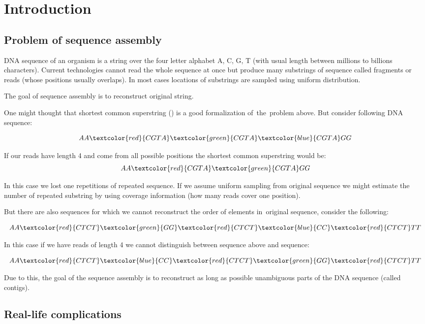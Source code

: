 \chapter{Introduction}

\section{Problem of sequence assembly}

DNA sequence of an organism is a string over the four letter alphabet A, C, G, T
(with usual length between millions to billions characters).
Current technologies cannot read the whole sequence at once but produce many
substrings of sequence called fragments or reads (whose positions usually overlaps).
In most cases locations of substrings are sampled using uniform distribution.

The goal of sequence assembly is to reconstruct original string.

One might thought that shortest common superstring (\cite{maier1977note}) 
is a good formalization of~the~problem above. But consider following DNA sequence:

$$AA\textcolor{red}{CGTA}\textcolor{green}{CGTA}\textcolor{blue}{CGTA}GG$$

If our reads have length 4 and come from all possible positions the shortest
common superstring would be:
$$AA\textcolor{red}{CGTA}\textcolor{green}{CGTA}GG$$

In this case we lost one repetitions of repeated sequence. If we assume uniform
sampling from original sequence we might estimate the number of repeated substring
by using coverage information (how many reads cover one position).

But there are also sequences for which we cannot reconstruct the order of elements
in~original sequence, consider the following:

$$AA\textcolor{red}{CTCT}\textcolor{green}{GG}\textcolor{red}{CTCT}\textcolor{blue}{CC}\textcolor{red}{CTCT}TT$$

In this case if we have reads of length 4 we cannot distinguish between sequence above and
sequence:

$$AA\textcolor{red}{CTCT}\textcolor{blue}{CC}\textcolor{red}{CTCT}\textcolor{green}{GG}\textcolor{red}{CTCT}TT$$

Due to this, the goal of the sequence assembly is to reconstruct as long as possible
unambiguous parts of the DNA sequence (called contigs).

\section{Real-life complications}

